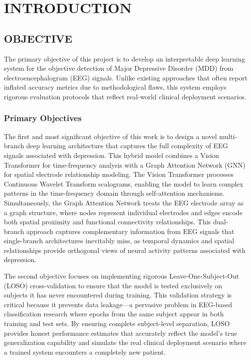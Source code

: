 
\chapter{INTRODUCTION}

\section{OBJECTIVE}

The primary objective of this project is to develop an interpretable deep learning system for the objective detection of Major Depressive Disorder (MDD) from electroencephalogram (EEG) signals. Unlike existing approaches that often report inflated accuracy metrics due to methodological flaws, this system employs rigorous evaluation protocols that reflect real-world clinical deployment scenarios.

\subsection{Primary Objectives}

The first and most significant objective of this work is to design a novel multi-branch deep learning architecture that captures the full complexity of EEG signals associated with depression. This hybrid model combines a Vision Transformer for time-frequency analysis with a Graph Attention Network (GNN) for spatial electrode relationship modeling. The Vision Transformer processes Continuous Wavelet Transform scalograms, enabling the model to learn complex patterns in the time-frequency domain through self-attention mechanisms. Simultaneously, the Graph Attention Network treats the EEG electrode array as a graph structure, where nodes represent individual electrodes and edges encode both spatial proximity and functional connectivity relationships. This dual-branch approach captures complementary information from EEG signals that single-branch architectures inevitably miss, as temporal dynamics and spatial relationships provide orthogonal views of neural activity patterns associated with depression.

The second objective focuses on implementing rigorous Leave-One-Subject-Out (LOSO) cross-validation to ensure that the model is tested exclusively on subjects it has never encountered during training. This validation strategy is critical because it prevents data leakage---a pervasive problem in EEG-based classification research where epochs from the same subject appear in both training and test sets. By ensuring complete subject-level separation, LOSO provides honest performance estimates that accurately reflect the model's true generalization capability and simulate the real clinical deployment scenario where a trained system encounters a completely new patient.

